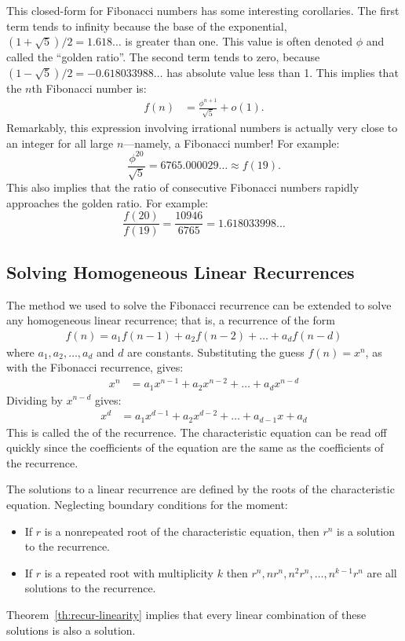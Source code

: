 This closed-form for Fibonacci numbers has some interesting
corollaries.  The first term tends to infinity because the base of the
exponential, $(1+\sqrt{5})/2 = 1.618\ldots$ is greater than one.
This value is often denoted $\phi$ and called the ``golden ratio''.
The second term tends to zero, because $(1-\sqrt{5})/2 =
-0.618033988\ldots$ has absolute value less than 1.  This implies that
the $n$th Fibonacci number is:
\begin{align*}
f(n) & = \frac{\phi^{n+1}}{\sqrt{5}} + o(1).
\end{align*}
Remarkably, this expression involving irrational numbers is actually
very close to an integer for all large $n$---namely, a Fibonacci
number!  For example:
\begin{equation*}
\frac{\phi^{20}}{\sqrt{5}} = 6765.000029\ldots \approx f(19).
\end{equation*}
This also implies that the ratio of consecutive
Fibonacci numbers rapidly approaches the golden ratio.  For example:
\begin{equation*}
\frac{f(20)}{f(19)} = \frac{10946}{6765} = 1.618033998\ldots
\end{equation*}

\subsection{Solving Homogeneous Linear Recurrences}

The method we used to solve the Fibonacci recurrence can be extended
to solve any homogeneous linear recurrence; that is, a recurrence of
the form
\begin{align*}
f(n) = a_1 f(n-1) + a_2 f(n-2) + \ldots + a_d f(n - d)
\end{align*}
where $a_1, a_2, \ldots, a_d$ and $d$ are constants.  Substituting the
guess $f(n) = x^n$, as with the Fibonacci recurrence, gives:
\begin{align*}
x^n & =a_1x^{n-1} +a_2x^{n-2} + \ldots +a_dx^{n-d}
\end{align*}
Dividing by $x^{n-d}$ gives:
\begin{align*}
x^d & = a_1x^{d-1} + a_2x^{d-2} + \ldots+a_{d-1}x+a_d
\end{align*}
This is called the  of the
recurrence. The characteristic equation can be read off quickly
since the coefficients of the equation are the same as the
coefficients of the recurrence.

The solutions to a linear recurrence are defined by the roots of the
characteristic equation. Neglecting boundary conditions for the
moment:
\begin{itemize}
\item If $r$ is a nonrepeated root of the characteristic equation,
  then $r^n$ is a solution to the recurrence.
\item If $r$ is a repeated root with multiplicity $k$ then $r^n,
  nr^n, n^2r^n, \ldots, n^{k-1}r^n$ are all solutions to the
  recurrence.
\end{itemize}
Theorem~\ref{th:recur-linearity} implies that every linear
  combination of these solutions is also a solution.

